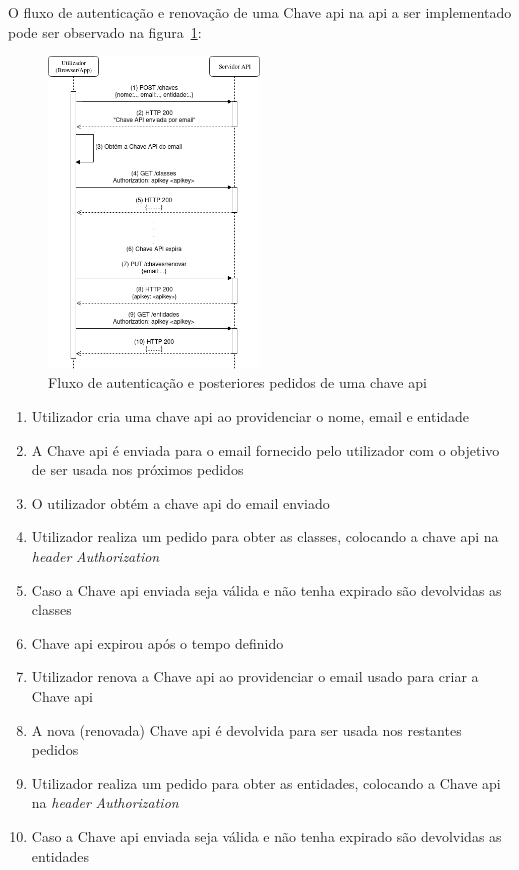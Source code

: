 O fluxo de autenticação e renovação de uma Chave \acrshort{api} na \acrshort{api} a ser implementado pode ser observado na figura~\ref{fig:chaveAuth}:
\begin{figure}[H]
    \centering
    \includegraphics[width=0.5\textwidth]{img/chaveAuth.png}
    \caption{Fluxo de autenticação e posteriores pedidos de uma chave \acrshort{api}}\label{fig:chaveAuth}
\end{figure}

\begin{enumerate}
    \item Utilizador cria uma chave \acrshort{api} ao providenciar o nome, email e entidade
    \item A Chave \acrshort{api} é enviada para o email fornecido pelo utilizador com o objetivo de ser usada nos próximos pedidos
    \item O utilizador obtém a chave \acrshort{api} do email enviado
    \item Utilizador realiza um pedido para obter as classes, colocando a chave \acrshort{api} na \textit{header} \textit{Authorization}
    \item Caso a Chave \acrshort{api} enviada seja válida e não tenha expirado são devolvidas as classes
    \item Chave \acrshort{api} expirou após o tempo definido
    \item Utilizador renova a Chave \acrshort{api} ao providenciar o email usado para criar a Chave \acrshort{api}
    \item A nova (renovada) Chave \acrshort{api} é devolvida para ser usada nos restantes pedidos
    \item Utilizador realiza um pedido para obter as entidades, colocando a Chave \acrshort{api} na \textit{header} \textit{Authorization}
    \item Caso a Chave \acrshort{api} enviada seja válida e não tenha expirado são devolvidas as entidades
\end{enumerate}

